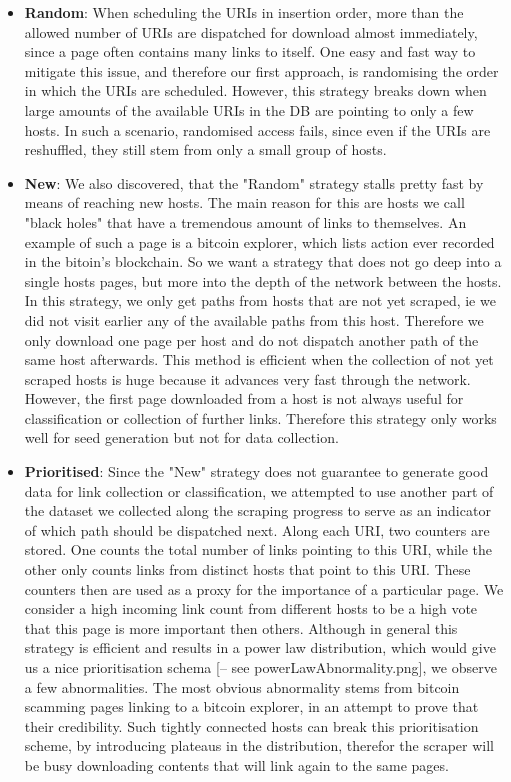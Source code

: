 \documentclass[USenglish,oneside,twocolumn]{article}
\begin{document}
\begin{itemize}
  \item \textbf{Random}: When scheduling the URIs in insertion order, more than the allowed number of URIs are dispatched for download almost immediately, since a page often contains many links to itself. One easy and fast way to mitigate this issue, and therefore our first approach, is randomising the order in which the URIs are scheduled. However, this strategy breaks down when large amounts of the available URIs in the DB are pointing to only a few hosts. In such a scenario, randomised access fails, since even if the URIs are reshuffled, they still stem from only a small group of hosts.
  \item \textbf{New}: We also discovered, that the "Random" strategy stalls pretty fast by means of reaching new hosts. The main reason for this are hosts we call "black holes" that have a tremendous amount of links to themselves. An example of such a page is a bitcoin explorer, which lists action ever recorded in the bitoin's blockchain. So we want a strategy that does not go deep into a single hosts pages, but more into the depth of the network between the hosts. In this strategy, we only get paths from hosts that are not yet scraped, ie we did not visit earlier any of the available paths from this host. Therefore we only download one page per host and do not dispatch another path of the same host afterwards. This method is efficient when the collection of not yet scraped hosts is huge because it advances very fast through the network. However, the first page downloaded from a host is not always useful for classification or collection of further links. Therefore this strategy only works well for seed generation but not for data collection.
  \item \textbf{Prioritised}: Since the "New" strategy does not guarantee to generate good data for link collection or classification, we attempted to use another part of the dataset we collected along the scraping progress to serve as an indicator of which path should be dispatched next. Along each URI, two counters are stored. One counts the total number of links pointing to this URI, while the other only counts links from distinct hosts that point to this URI. These counters then are used as a proxy for the importance of a particular page. We consider a high incoming link count from different hosts to be a high vote that this page is more important then others. Although in general this strategy is efficient and results in a power law distribution, which would give us a nice prioritisation schema [-- see powerLawAbnormality.png], we observe a few abnormalities. The most obvious abnormality stems from bitcoin scamming pages linking to a bitcoin explorer, in an attempt to prove that their credibility. Such tightly connected hosts can break this prioritisation scheme, by introducing plateaus in the distribution, therefor the scraper will be busy downloading contents that will link again to the same pages.

\end{itemize}
\end{document}
